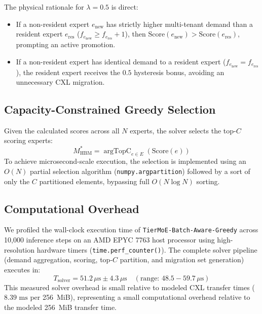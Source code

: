 \documentclass[10pt,journal,compsoc]{IEEEtran}
\begin{document}
The physical rationale for $\lambda = 0.5$ is direct:
\begin{itemize}
    \item If a non-resident expert $e_{\text{new}}$ has strictly higher multi-tenant demand than a resident expert $e_{\text{res}}$ ($f_{e_{\text{new}}} \ge f_{e_{\text{res}}} + 1$), then $\text{Score}(e_{\text{new}}) > \text{Score}(e_{\text{res}})$, prompting an active promotion.
    \item If a non-resident expert has identical demand to a resident expert ($f_{e_{\text{new}}} = f_{e_{\text{res}}}$), the resident expert receives the $0.5$ hysteresis bonus, avoiding an unnecessary CXL migration.
\end{itemize}

\subsection{Capacity-Constrained Greedy Selection}
Given the calculated scores across all $N$ experts, the solver selects the top-$C$ scoring experts:
\begin{equation}
    M_{\text{HBM}}^* = \operatorname{argTopC}_{e \in E} \left( \text{Score}(e) \right)
\end{equation}
To achieve microsecond-scale execution, the selection is implemented using an $O(N)$ partial selection algorithm (\texttt{numpy.argpartition}) followed by a sort of only the $C$ partitioned elements, bypassing full $O(N \log N)$ sorting.

\subsection{Computational Overhead}
We profiled the wall-clock execution time of \texttt{TierMoE-Batch-Aware-Greedy} across 10,000 inference steps on an AMD EPYC 7763 host processor using high-resolution hardware timers (\texttt{time.perf_counter()}). The complete solver pipeline (demand aggregation, scoring, top-$C$ partition, and migration set generation) executes in:
\begin{equation}
    T_{\text{solver}} = 51.2\,\mu\text{s} \pm 4.3\,\mu\text{s} \quad (\text{range: } 48.5 - 59.7\,\mu\text{s})
\end{equation}
This measured solver overhead is small relative to modeled CXL transfer times ($8.39\text{ ms}$ per 256~MiB), representing a small computational overhead relative to the modeled 256~MiB transfer time.

\end{document}
